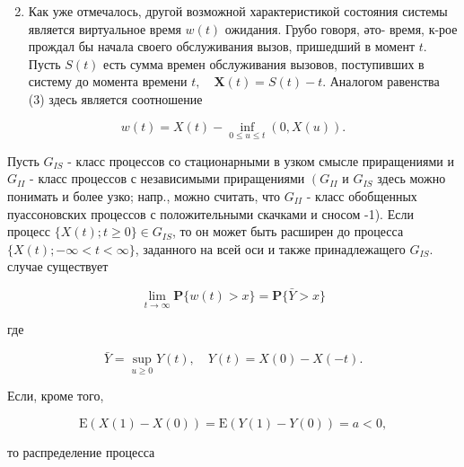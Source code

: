 \documentclass[10pt]{article}
\begin{document}
\begin{enumerate}

  \setcounter{enumi}{1}

  \item Как уже отмечалось, другой возможной характеристикой состояния системы является виртуальное время $w(t)$ ожидания. Грубо говоря, әто- время, к-рое прождал бы начала своего обслуживания вызов, пришедший в момент $t$. Пусть $S(t)$ есть сумма времен обслуживания вызовов, поступивших в систему до момента времени $t, \quad \boldsymbol{X}(t)=S(t)-t$. Аналогом равенства (3) здесь является соотношение

\end{enumerate}



\[

w(t)=X(t)-\inf _{0 \leqslant u \leqslant t}(0, X(u)) .

\]



Пусть $G_{I S}$ - класс процессов со стационарными в узком смысле приращениями и $G_{I I}$ - класс процессов с независимыми приращениями $\left(G_{I I}\right.$ и $G_{I S}$ здесь можно понимать и более узко; напр., можно считать, что $G_{I I}$ - класс обобщенных пуассоновских процессов с положительными скачками и сносом -1). Если процесс $\{X(t) ; t \geqslant 0\} \in G_{I S}$, то он может быть расширен до процесса $\{X(t) ;-\infty<t<\infty\}$, заданного на всей оси и также принадлежащего $G_{I S}$. случае существует



\[

\lim _{t \rightarrow \infty} \mathbf{P}\{w(t)>x\}=\mathbf{P}\{\bar{Y}>x\}

\]



где



\[

\bar{Y}=\sup _{u \geqslant 0} Y(t), \quad Y(t)=X(0)-X(-t) .

\]



Если, кроме того,



\[

\mathrm{E}(X(1)-X(0))=\mathrm{E}(Y(1)-Y(0))=a<0,

\]



то распределение процесса
\end{document}
